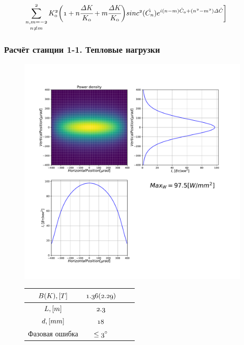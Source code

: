 \documentclass[14pt, hyperref = {colorlinks}]{beamer}
\begin{document}
\begin{frame}
\begin{figure}[h]
	$\mathnormal{\displaystyle\mathop{\sum\limits_{n, m =-2}^{2}}_{n \neq m}K^2_0\bigg(1 + n\cfrac{\Delta K}{K_0} + m\cfrac{\Delta K}{K_0}\bigg)
	sinc^2(\hat{C_n})e^{i(n-m)\hat{C}_0 + (n^2 - m^2)\Delta \hat{C}}\bigg]}$
\end{figure}
\end{frame}

\small
\begin{frame}
\frametitle{Расчёт станции 1-1. Тепловые нагрузки}\label{t1}
\vspace{-10pt}
\begin{figure}[h]
	\begin{minipage}[h]{0.49\linewidth}
	\raggedright{\includegraphics[width=1.3\linewidth]{pic/power_dens.pdf}}
	\end{minipage}
	\begin{minipage}[h]{0.49\linewidth}
		\vspace{-105pt}	
		\tiny
		\begin{table}[h]
			\begin{tabular}{|c|c|c|c|}
				\hline\hline
				\rule{0pt}{3ex}$\mathnormal{B(K), [T]}$      & $\mathnormal{1.36(2.29)}$   \\ \hline
				\rule{0pt}{3ex}$\mathnormal{L, [m]}$ & $\mathnormal{2.3}$        \\ \hline
				\rule{0pt}{3ex}$\mathnormal{d, [mm]}$     & $\mathnormal{18}$    \\ \hline
				\rule{0pt}{3ex}Фазовая ошибка &$ \mathnormal{\leq 3^{\circ}}$    \\
				\hline
			\end{tabular}
		\end{table}
	\end{minipage}
\end{figure}

\end{frame}
\end{document}
